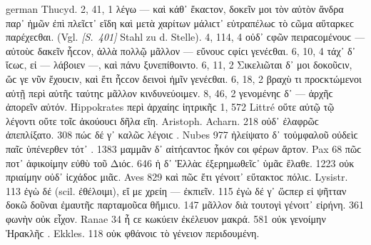 \begin{otherlanguage*}{german}
Thucyd. 2, 41, 1 λέγω — καὶ κάθ᾽ ἕκαϲτον, δοκεῖν  μοι τὸν αὐτὸν ἄνδρα παρ᾽ ἡμῶν ἐπὶ πλεῖϲτ᾽  εἴδη καὶ μετὰ χαρίτων μάλιϲτ᾽ εὐτραπέλωϲ τὸ ϲῶμα αὔταρκεϲ παρέχεϲθαι. (Vgl. \hypertarget{p401}{\emph{[S.~401]}}\label{p401} Stahl zu d. Stelle). 4, 114, 4 οὐδ᾽  ϲφῶν πειραϲομένουϲ — αὐτοὺϲ δακεῖν ἧϲϲον, ἀλλὰ πολλῷ μᾶλλον — εὔνουϲ  ϲφίϲι γενέϲθαι. 6, 10, 4 τάχ᾽  δ᾽ ἴϲωϲ, εἰ — λάβοιεν —, καὶ πάνυ  ξυνεπίθοιντο. 6, 11, 2 Σικελιῶται δ᾽  μοι δοκοῦϲιν, ὥϲ γε νῦν ἔχουϲιν, καὶ ἔτι  ἧϲϲον δεινοὶ ἡμῖν γενέϲθαι. 6, 18, 2 βραχὺ  τι προϲκτώμενοι αὐτῇ περὶ αὐτῆϲ  ταύτηϲ μᾶλλον κινδυνεύοιμεν. 8, 46, 2 γενομένηϲ δ᾽  — ἀρχῆϲ ἀπορεῖν  αὐτόν. Hippokrates περὶ ἀρχαίηϲ ἰητρικῆϲ 1, 572 Littré οὔτε  αὐτῷ τῷ λέγοντι οὔτε τοῖϲ ἀκούουϲι δῆλα  εἴη. Aristoph. Acharn. 218 οὐδ᾽  ἐλαφρῶϲ  ἀπεπλίξατο. 308 πώϲ δέ γ᾽  καλῶϲ λέγοιϲ . Nubes 977 ἠλείψατο δ᾽  τοὐμφαλοῦ οὐδεὶϲ παῖϲ ὑπένερθεν τότ᾽ . 1383 μαμμᾶν δ᾽  αἰτήϲαντοϲ ἧκόν ϲοι φέρων  ἄρτον. Pax 68 πῶϲ  ποτ᾽ ἀφικοίμην  εὐθὺ τοῦ Διόϲ. 646 ἡ δ᾽ Ἑλλὰϲ  ἐξερημωθεῖϲ᾽  ὑμᾶϲ ἔλαθε. 1223 οὐκ  πριαίμην οὐδ᾽  ἰϲχάδοϲ μιᾶϲ. Aves 829 καὶ πῶϲ  ἔτι γένοιτ᾽  εὔτακτοϲ πόλιϲ. Lysistr. 113 ἐγὼ δέ   (scil. ἐθέλοιμι), εἴ με χρείη — ἐκπιεῖν. 115 ἐγὼ δέ γ᾽   ὥϲπερ εἰ ψῆτταν δοκῶ δοῦναι  ἐμαυτῆϲ παρταμοῦϲα θἤμιϲυ. 147 μᾶλλον  διὰ τουτογὶ γένοιτ᾽  εἰρήνη. 361 φωνὴν  οὐκ  εἶχον. Ranae 34 ἦ  ϲε κωκύειν  ἐκέλευον μακρά. 581 οὐκ  γενοίμην Ἡρακλῆϲ . Ekkles. 118 οὐκ  φθάνοιϲ τὸ γένειον  περιδουμένη.


\end{otherlanguage*}
